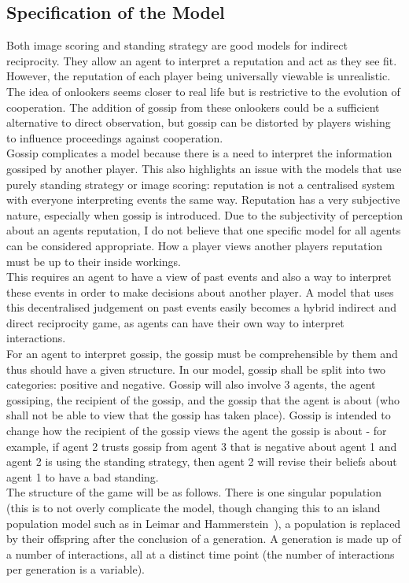 \documentclass[twoside,twocolumn]{article}
\begin{document}
\subsection{Specification of the Model}
Both image scoring and standing strategy are good models for indirect reciprocity. They allow an agent to interpret a reputation and act as they see fit. However, the reputation of each player being universally viewable is unrealistic. The idea of onlookers seems closer to real life but is restrictive to the evolution of cooperation. The addition of gossip from these onlookers could be a sufficient alternative to direct observation, but gossip can be distorted by players wishing to influence proceedings against cooperation.\\
Gossip complicates a model because there is a need to interpret the information gossiped by another player. This also highlights an issue with the models that use purely standing strategy or image scoring: reputation is not a centralised system with everyone interpreting events the same way. Reputation has a very subjective nature, especially when gossip is introduced. Due to the subjectivity of perception about an agents reputation, I do not believe that one specific model for all agents can be considered appropriate. How a player views another players reputation must be up to their inside workings.\\
This requires an agent to have a view of past events and also a way to interpret these events in order to make decisions about another player. A model that uses this decentralised judgement on past events easily becomes a hybrid indirect and direct reciprocity game, as agents can have their own way to interpret interactions.\\
For an agent to interpret gossip, the gossip must be comprehensible by them and thus should have a given structure. In our model, gossip shall be split into two categories: positive and negative. Gossip will also involve 3 agents, the agent gossiping, the recipient of the gossip, and the gossip that the agent is about (who shall not be able to view that the gossip has taken place). Gossip is intended to change how the recipient of the gossip views the agent the gossip is about - for example, if agent 2 trusts gossip from agent 3 that is negative about agent 1 and agent 2 is using the standing strategy, then agent 2 will revise their beliefs about agent 1 to have a bad standing.\\
The structure of the game will be as follows. There is one singular population (this is to not overly complicate the model, though changing this to an island population model such as in Leimar and Hammerstein~\cite{leimarhammer}), a population is replaced by their offspring after the conclusion of a generation. A generation is made up of a number of interactions, all at a distinct time point (the number of interactions per generation is a variable).\\
\end{document}
